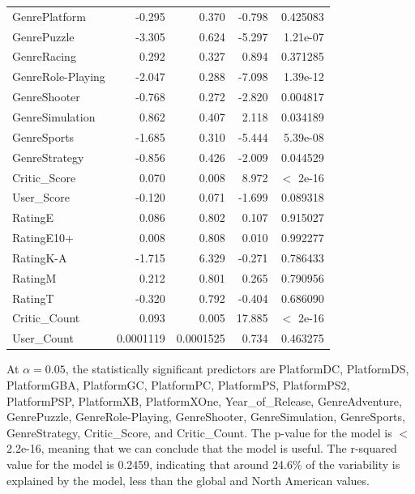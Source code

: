 \documentclass[12pt]{article}
\begin{document}
\begin{table}[ht]
\begin{tabular}{lrrrr}
    GenrePlatform & -0.295 & 0.370 & -0.798 & 0.425083 \\
    GenrePuzzle & -3.305 & 0.624 & -5.297 & 1.21e-07 \\
    GenreRacing & 0.292 & 0.327 & 0.894 & 0.371285 \\
    GenreRole-Playing & -2.047 & 0.288 & -7.098 & 1.39e-12 \\
    GenreShooter & -0.768 & 0.272 & -2.820 & 0.004817 \\
    GenreSimulation & 0.862 & 0.407 & 2.118 & 0.034189 \\
    GenreSports & -1.685 & 0.310 & -5.444 & 5.39e-08 \\
    GenreStrategy & -0.856 & 0.426 & -2.009 & 0.044529 \\
    Critic\_Score & 0.070 & 0.008 & 8.972 & $<$ 2e-16 \\
    User\_Score & -0.120 & 0.071 & -1.699 & 0.089318 \\
    RatingE & 0.086 & 0.802 & 0.107 & 0.915027 \\
    RatingE10+ & 0.008 & 0.808 & 0.010 & 0.992277 \\
    RatingK-A & -1.715 & 6.329 & -0.271 & 0.786433 \\
    RatingM & 0.212 & 0.801 & 0.265 & 0.790956 \\
    RatingT & -0.320 & 0.792 & -0.404 & 0.686090 \\
    Critic\_Count & 0.093 & 0.005 & 17.885 & $<$ 2e-16 \\
    User\_Count & 0.0001119 & 0.0001525 & 0.734 & 0.463275 \\
    \hline
  \end{tabular}
\end{table}

At $\alpha=0.05$, the statistically significant predictors are PlatformDC, PlatformDS, PlatformGBA, PlatformGC, PlatformPC, PlatformPS, 
PlatformPS2, PlatformPSP, PlatformXB, PlatformXOne, Year_of_Release, GenreAdventure, GenrePuzzle, GenreRole-Playing, GenreShooter, 
GenreSimulation, GenreSports, GenreStrategy, Critic_Score, and Critic_Count.  
The p-value for the model is $<$ 2.2e-16, meaning that we can conclude that the model is useful. The r-squared value for the model is 0.2459,
indicating that around 24.6\% of the variability is explained by the model, less than the global and North American values.
\end{document}

